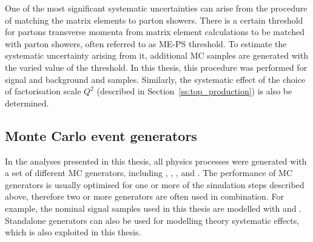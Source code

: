 One of the most significant systematic uncertainties can arise from the procedure of matching the matrix elements to
parton showers. There is a certain threshold for partons transverse momenta from matrix element calculations to be
matched with parton showers, often referred to as ME-PS threshold. To estimate the systematic uncertainty arising from
it, additional MC samples are generated with the varied value of the threshold. In this thesis, this procedure was
performed for signal \ttjets and background \WpJets and \ZpJets samples. Similarly, the systematic effect of the choice
of factorisation scale $Q^2$ (described in Section~\ref{ss:top_production}) is also be determined.

\subsection{Monte Carlo event generators}
\label{ss:MC_generators}
In the analyses presented in this thesis, all physics processes were generated with a set of different MC generators,
including \MADGRAPH \autocite{MadGraph}, \PYTHIA \autocite{Pythia,Pythia6.4}, \MCATNLO \autocite{MCatNLO}, and \POWHEG
\autocite{POWHEG}. The performance of MC generators is usually optimised for one or more of the simulation steps
described above, therefore two or more generators are often used in combination. For example, the nominal \ttbar signal
samples used in this thesis are modelled with \MADGRAPH and \PYTHIA. Standalone generators can also be used for
modelling theory systematic effects, which is also exploited in this thesis.


